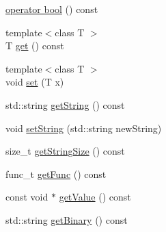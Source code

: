 \begin{DoxyCompactItemize}
\begin{DoxyCompactList}\small\item\em \end{DoxyCompactList}\item 
\hyperlink{classkdb_1_1Key_ac203d41896988df49dd149c2a6ad91d8}{operator bool} () const 
\item 
{\footnotesize template$<$class T $>$ }\\T \hyperlink{classkdb_1_1Key_ae8f4cf386b825c8efc29ce0db977f0d2}{get} () const 
\begin{DoxyCompactList}\small\item\em \end{DoxyCompactList}\item 
{\footnotesize template$<$class T $>$ }\\void \hyperlink{classkdb_1_1Key_a615124f0a2b291e03975b49c233654d7}{set} (T x)
\begin{DoxyCompactList}\small\item\em \end{DoxyCompactList}\item 
std\-::string \hyperlink{classkdb_1_1Key_afbad98e920ffb6d65d5d690be73ae6d9}{get\-String} () const 
\item 
void \hyperlink{classkdb_1_1Key_ab97ef37aa235f0ae04dc6e6c21109d1a}{set\-String} (std\-::string new\-String)
\begin{DoxyCompactList}\small\item\em \end{DoxyCompactList}\item 
size\-\_\-t \hyperlink{classkdb_1_1Key_ab0e969cebf209e76b544ed507782c30c}{get\-String\-Size} () const 
\begin{DoxyCompactList}\small\item\em \end{DoxyCompactList}\item 
func\-\_\-t \hyperlink{classkdb_1_1Key_a9e4f81dae7370976dad75030e8c0d084}{get\-Func} () const 
\item 
const void $\ast$ \hyperlink{classkdb_1_1Key_a3e0bbc6b746b89db7abb73a4cc2fff39}{get\-Value} () const 
\begin{DoxyCompactList}\small\item\em \end{DoxyCompactList}\item 
std\-::string \hyperlink{classkdb_1_1Key_a16b64fd6db0a743e2e4ab08daf6fba73}{get\-Binary} () const 
\begin{DoxyCompactList}\small\item\em \end{DoxyCompactList}\item 

\end{DoxyCompactItemize}
